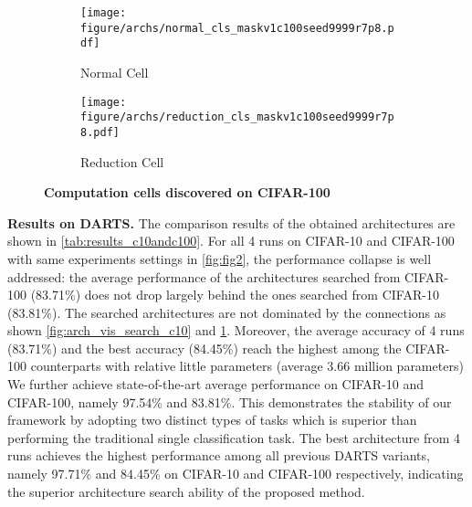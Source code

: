 \documentclass[10pt,twocolumn,letterpaper]{article}
\newcommand{\mypara}[1]{\vspace{1mm}\noindent\textbf{#1}}
\begin{document}
\begin{table}
\begin{center}
{      }
    \label{tab:nas201}
  \end{center}
  \vspace{-6pt}
\end{table} \begin{figure}
  \centering
  \begin{subfigure}{0.8\linewidth}
    \centering
    \texttt{[image: figure/archs/normal\_cls\_maskv1c100seed9999r7p8.pdf]}
    \vspace{-6pt}
    \caption{Normal Cell}
  \end{subfigure}

  \begin{subfigure}{0.8\linewidth}
    \centering
    \texttt{[image: figure/archs/reduction\_cls\_maskv1c100seed9999r7p8.pdf]}
    \vspace{-6pt}
    \caption{Reduction Cell}
  \end{subfigure}
  \vspace{-6pt}
  \caption{\textbf{Computation cells discovered on CIFAR-100}}
  \vspace{-6pt}
  \label{fig:arch_vis_search_c100}
\end{figure} \mypara{Results on DARTS.}
The comparison results of the obtained architectures are shown in \cref{tab:results_c10andc100}.
For all 4 runs on CIFAR-10 and CIFAR-100 with same experiments settings in \cref{fig:fig2}, the performance collapse is well addressed:
the average performance of the architectures searched from CIFAR-100 (83.71\%) does not drop largely behind the ones searched from CIFAR-10 (83.81\%).
The searched architectures are not dominated by the  connections as shown \cref{fig:arch_vis_search_c10} and \cref{fig:arch_vis_search_c100}.
Moreover, the average accuracy of 4 runs (83.71\%) and the best accuracy (84.45\%) reach the highest among the CIFAR-100 counterparts with relative little parameters (average 3.66 million parameters)
We further achieve state-of-the-art average performance on CIFAR-10 and CIFAR-100, namely 97.54\% and 83.81\%. 
This demonstrates the stability of our 
framework
by adopting two distinct types of tasks which is superior than performing the traditional single classification task.
The best architecture from 4 runs achieves the highest performance among all previous DARTS variants, namely 97.71\% and 84.45\% on CIFAR-10 and CIFAR-100 respectively,
indicating the superior architecture search ability of the proposed method.
\end{document}
